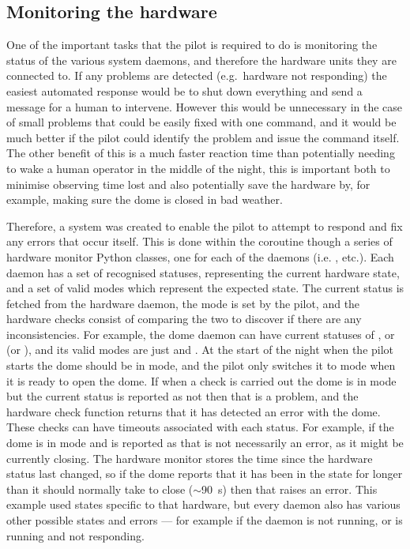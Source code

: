 \subsection{Monitoring the hardware}
\label{sec:monitors}
\begin{colsection}

One of the important tasks that the pilot is required to do is monitoring the status of the various system daemons, and therefore the hardware units they are connected to. If any problems are detected (e.g.\ hardware not responding) the easiest automated response would be to shut down everything and send a message for a human to intervene. However this would be unnecessary in the case of small problems that could be easily fixed with one command, and it would be much better if the pilot could identify the problem and issue the command itself. The other benefit of this is a much faster reaction time than potentially needing to wake a human operator in the middle of the night, this is important both to minimise observing time lost and also potentially save the hardware by, for example, making sure the dome is closed in bad weather.

Therefore, a system was created to enable the pilot to attempt to respond and fix any errors that occur itself. This is done within the  coroutine though a series of hardware monitor Python classes, one for each of the daemons (i.e. ,  etc.). Each daemon has a set of recognised statuses, representing the current hardware state, and a set of valid modes which represent the expected state. The current status is fetched from the hardware daemon, the mode is set by the pilot, and the hardware checks consist of comparing the two to discover if there are any inconsistencies. For example, the dome daemon can have current statuses of ,  or  (or ), and its valid modes are just  and . At the start of the night when the pilot starts the dome should be in  mode, and the pilot only switches it to  mode when it is ready to open the dome. If when a check is carried out the dome is in  mode but the current status is reported as not  then that is a problem, and the hardware check function returns that it has detected an error with the dome. These checks can have timeouts associated with each status. For example, if the dome is in  mode and is reported as  that is not necessarily an error, as it might be currently closing. The hardware monitor stores the time since the hardware status last changed, so if the dome reports that it has been in the  state for longer than it should normally take to close ($\sim$\SI{90}{\second}) then that raises an error. This example used states specific to that hardware, but every daemon also has various other possible states and errors --- for example if the daemon is not running, or is running and not responding.


\end{colsection}
